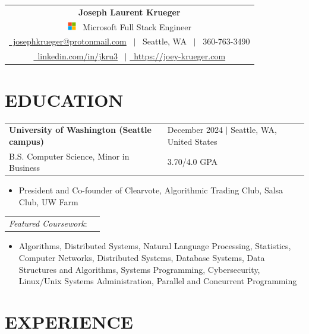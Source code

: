 \documentclass[10.5pt,letterpaper]{article}
\makeatletter
\newcommand{\header}[2]{
    \noindent
    \begin{tabularx}{\linewidth}{@{} C @{}}
        \Huge\textbf{Joseph Laurent Krueger} \\[5pt]
        #1 \ {\Large #2} \\[5pt]
        \href{mailto:josephfkrueger@protonmail.com}{{\color{primarycolor}\faEnvelope}\ josephkrueger@protonmail.com} \ $|$ 
        {{\color{primarycolor}\faMapPin}\ Seattle, WA} \ $|$ 
        {{\color{primarycolor}\faMobile}\ 360-763-3490} \\[3pt]
        \href{https://linkedin.com/in/jkru3}{{\color{primarycolor}\faLinkedin}\ linkedin.com/in/jkru3} \ $|$ 
        \href{https://joey-krueger.com}{{\color{primarycolor}\faGlobeAmericas}\ https://joey-krueger.com}
    \end{tabularx}
}
\newcommand{\educationentry}[5]{
    \begin{tabularx}{\textwidth}{lX}
        \textbf{#1} & \hfill {\textcolor{primarycolor}{#3}} $|$ #4 \\[0pt]
        #2 & \hfill #5 \\[0pt]
    \end{tabularx}
}
\makeatother
\begin{document}
\header{\includegraphics[height=1em]{../logos/microsoft.png}}{Microsoft Full Stack Engineer}
\vspace{-10pt}

\section{\faGraduationCap{ }EDUCATION}
\vspace{4pt}
\educationentry{University of Washington (Seattle campus)}{B.S. Computer Science, Minor in Business}{December 2024}{Seattle, WA, United States}{3.70/4.0 GPA}
\begin{itemize}[leftmargin=1.5em, nosep, noitemsep] %
  \item[] President and Co-founder of Clearvote, Algorithmic Trading Club, Salsa Club, UW Farm
\end{itemize}
\begin{tabularx}{\textwidth}{lX}
  \textit{Featured Coursework}: & \\ 
\end{tabularx}
\begin{itemize}[leftmargin=1.5em, nosep, noitemsep] %
  \item[] 
  Algorithms, 
  Distributed Systems, 
  Natural Language Processing, 
  Statistics,
  Computer Networks,
  Distributed Systems,
  Database Systems,
  Data Structures and Algorithms,
  Systems Programming,
  Cybersecurity,
  Linux/Unix Systems Administration,
  Parallel and Concurrent Programming
\end{itemize}
\vspace{-20pt}

\section{\faCode{ }EXPERIENCE}
\vspace{4pt}



% 
\vspace{-10pt}
\end{document}
